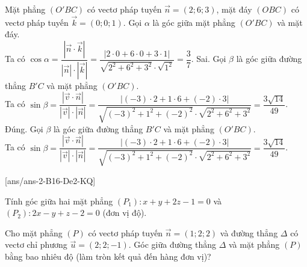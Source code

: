 \begin{ex}
{\begin{itemchoice}
	Mặt phẳng $(O'BC)$ có vectơ pháp tuyến $\overrightarrow{n}=(2;6;3)$, mặt đáy $(OBC)$ có vectơ pháp tuyến $\overrightarrow{k}=(0;0;1)$. Gọi $\alpha$ là góc giữa mặt phẳng $(O'BC)$ và mặt đáy.\\
	Ta có $\cos\alpha =\dfrac{\left |\overrightarrow{n}\cdot\overrightarrow{k} \right |}{\left |\overrightarrow{n} \right |\cdot\left |\overrightarrow{k} \right |}=\dfrac{\left |2\cdot 0+6\cdot 0+3\cdot 1 \right |}{\sqrt{2^2+6^2+3^2}\cdot\sqrt{1^2}}=\dfrac{3}{7}$.
	\itemch Sai. Gọi $\beta$ là góc giữa đường thẳng $B'C$ và mặt phẳng $(O'BC)$.\\
	Ta có $\sin\beta =\dfrac{\left |\overrightarrow{v}\cdot\overrightarrow{n} \right |}{\left |\overrightarrow{v} \right |\cdot\left |\overrightarrow{n} \right |}=\dfrac{\left |(-3)\cdot 2+1\cdot 6+(-2)\cdot 3 \right |}{\sqrt{(-3)^2+1^2+(-2)^2}\cdot\sqrt{2^2+6^2+3^2}}=\dfrac{3\sqrt{14}}{49}$.
	\itemch Đúng. Gọi $\beta$ là góc giữa đường thẳng $B'C$ và mặt phẳng $(O'BC)$.\\
	Ta có $\sin\beta =\dfrac{\left |\overrightarrow{v}\cdot\overrightarrow{n} \right |}{\left |\overrightarrow{v} \right |\cdot\left |\overrightarrow{n} \right |}=\dfrac{\left |(-3)\cdot 2+1\cdot 6+(-2)\cdot 3 \right |}{\sqrt{(-3)^2+1^2+(-2)^2}\cdot\sqrt{2^2+6^2+3^2}}=\dfrac{3\sqrt{14}}{49}$.
	\end{itemchoice}
	}
\end{ex}
[ans/ans-2-B16-De2-KQ]
\caukq
\begin{ex}%
	Tính góc giữa hai mặt phẳng $(P_1)\colon x+y+2z-1=0$ và $(P_2)\colon 2x-y+z-2=0$ (đơn vị độ).
	\par{}
\end{ex}
\begin{ex}%
	Cho mặt phẳng $(P)$ có vectơ pháp tuyến $\overrightarrow{n}=(1 ; 2 ; 2)$ và đường thẳng $\Delta$ có vectơ chỉ phương $\overrightarrow{u}=(2 ; 2 ;-1)$. Góc giữa đường thẳng $\Delta$ và mặt phẳng $(P)$ bằng bao nhiêu độ (làm tròn kết quả đến hàng đơn vị)?
	\par{}
\end{ex}
